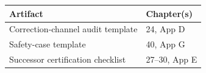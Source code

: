 
\begin{longtable}{@{}ll@{}}
\toprule
\textbf{Artifact} & \textbf{Chapter(s)} \\
\midrule
Correction-channel audit template & 24, App D \\
Safety-case template & 40, App G \\
Successor certification checklist & 27–30, App E \\
\bottomrule
\end{longtable}
